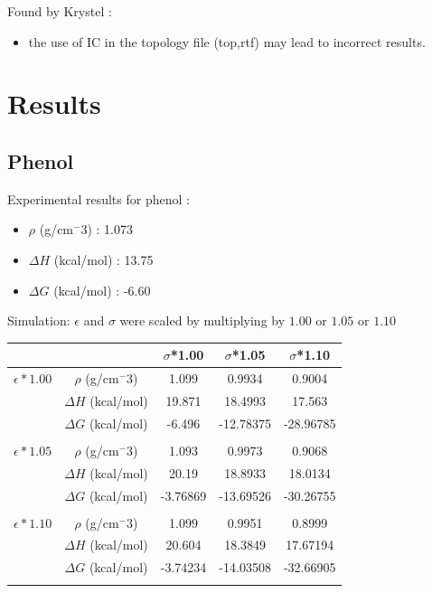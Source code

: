\documentclass[12pt,a4paper]{article}
\begin{document}
Found by Krystel : 
\begin{itemize}
\item the use of IC in the topology file (top,rtf) may lead to incorrect results.
\end{itemize}


\section{Results}

\subsection{Phenol}

Experimental results for phenol :

\begin{itemize}
\item $\rho$ (g/cm$^-3$) : 1.073
\item $\Delta H$ (kcal/mol) : 13.75
\item $\Delta G$ (kcal/mol) : -6.60
\end{itemize}

\medskip

Simulation: $\epsilon$ and $\sigma$ were scaled by multiplying by $1.00$ or $1.05$ or $1.10$

\begin{center}
\begin{tabular}{|c|c|c|c|c|}
\hline  &  & $\sigma$*1.00 & $\sigma$*1.05 & $\sigma$*1.10 \\ 
\hline $\epsilon*1.00$ & $\rho$ (g/cm$^-3$) & 1.099 & 0.9934 & 0.9004 \\ 
\hline  & $\Delta H$ (kcal/mol) & 19.871 & 18.4993 & 17.563 \\ 
\hline  & $\Delta G$ (kcal/mol) & -6.496 & -12.78375 & -28.96785 \\ 
\hline  &  &  &  &  \\ 
\hline $\epsilon*1.05$ & $\rho$ (g/cm$^-3$) & 1.093 & 0.9973 & 0.9068 \\ 
\hline  & $\Delta H$ (kcal/mol) & 20.19 & 18.8933 & 18.0134 \\ 
\hline  & $\Delta G$ (kcal/mol) & -3.76869 & -13.69526 & -30.26755 \\ 
\hline  &  &  &  &  \\ 
\hline $\epsilon*1.10$ & $\rho$ (g/cm$^-3$)& 1.099 & 0.9951 & 0.8999 \\ 
\hline  & $\Delta H$ (kcal/mol) & 20.604 & 18.3849 & 17.67194 \\ 
\hline  & $\Delta G$ (kcal/mol) & -3.74234 & -14.03508 & -32.66905 \\
\hline  &  &  &  &  \\ 
\hline 
\end{tabular} 
\end{center}
\end{document}
